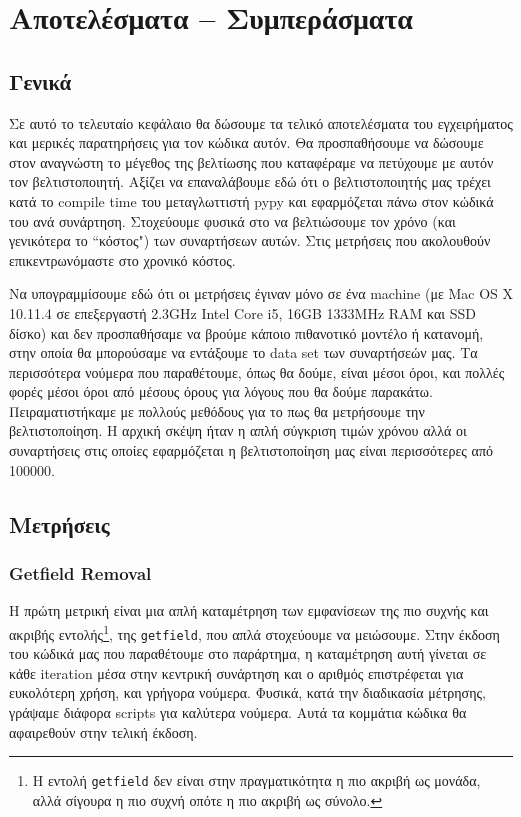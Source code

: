 
\chapter{Αποτελέσματα – Συμπεράσματα}
\label{chapter5}

\section{Γενικά}

Σε αυτό το τελευταίο κεφάλαιο θα δώσουμε τα τελικό αποτελέσματα του εγχειρήματος
και μερικές παρατηρήσεις για τον κώδικα αυτόν. Θα προσπαθήσουμε να δώσουμε στον
αναγνώστη το μέγεθος της βελτίωσης που καταφέραμε να πετύχουμε με αυτόν τον
βελτιστοποιητή. Αξίζει να επαναλάβουμε εδώ ότι ο βελτιστοποιητής μας τρέχει κατά
το compile time του μεταγλωττιστή pypy και εφαρμόζεται πάνω στον κώδικά του ανά
συνάρτηση. Στοχεύουμε φυσικά στο να βελτιώσουμε τον χρόνο (και γενικότερα το
``κόστος") των συναρτήσεων αυτών. Στις μετρήσεις που ακολουθούν επικεντρωνόμαστε
στο χρονικό κόστος.

Να υπογραμμίσουμε εδώ ότι οι μετρήσεις έγιναν μόνο σε ένα machine (με Mac OS X
10.11.4 σε επεξεργαστή 2.3GHz Intel Core i5, 16GB 1333MHz RAM και SSD δίσκο) και
δεν προσπαθήσαμε να βρούμε κάποιο πιθανοτικό μοντέλο ή κατανομή, στην οποία θα
μπορούσαμε να εντάξουμε το data set των συναρτήσεών μας. Τα περισσότερα νούμερα
που παραθέτουμε, όπως θα δούμε, είναι μέσοι όροι, και πολλές φορές μέσοι όροι
από μέσους όρους για λόγους που θα δούμε παρακάτω. Πειραματιστήκαμε με πολλούς
μεθόδους για το πως θα μετρήσουμε την βελτιστοποίηση. Η αρχική σκέψη ήταν η απλή
σύγκριση τιμών χρόνου αλλά οι συναρτήσεις στις οποίες εφαρμόζεται η
βελτιστοποίηση μας είναι περισσότερες από 100000.

\section{Μετρήσεις}

\subsection{Getfield Removal}

Η πρώτη μετρική είναι μια απλή καταμέτρηση των εμφανίσεων της πιο συχνής και
ακριβής εντολής\footnote{Η εντολή \texttt{getfield} δεν είναι στην
πραγματικότητα η πιο ακριβή ως μονάδα, αλλά σίγουρα η πιο συχνή οπότε η πιο
ακριβή ως σύνολο.}, της \texttt{getfield}, που απλά στοχεύουμε να μειώσουμε.
Στην έκδοση του κώδικά μας που παραθέτουμε στο παράρτημα, η καταμέτρηση αυτή
γίνεται σε κάθε iteration μέσα στην κεντρική συνάρτηση και ο αριθμός
επιστρέφεται για ευκολότερη χρήση, και γρήγορα νούμερα. Φυσικά, κατά την
διαδικασία μέτρησης, γράψαμε διάφορα scripts για καλύτερα νούμερα. Αυτά τα
κομμάτια κώδικα θα αφαιρεθούν στην τελική έκδοση.

